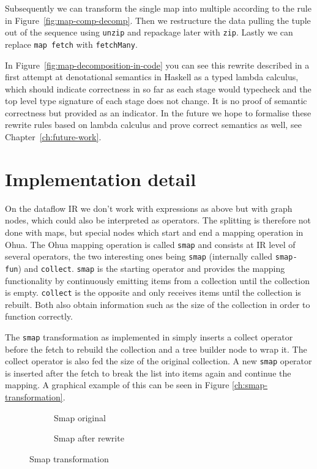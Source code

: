 Subsequently we can transform the single map into multiple according to the rule in Figure~\ref{fig:map-comp-decomp}.
Then we restructure the data pulling the tuple out of the sequence using \texttt{unzip} and repackage later with \texttt{zip}.
Lastly we can replace \texttt{map fetch} with \texttt{fetchMany}.

In Figure~\ref{fig:map-decomposition-in-code} you can see this rewrite described in a first attempt at denotational semantics in Haskell as a typed lambda calculus, which should indicate correctness in so far as each stage would typecheck and the top level type signature of each stage does not change.
It is no proof of semantic correctness but provided as an indicator.
In the future we hope to formalise these rewrite rules based on lambda calculus and prove correct semantics as well, see Chapter~\ref{ch:future-work}.


\section{Implementation detail}

On the dataflow IR we don't work with expressions as above but with graph nodes, which could also be interpreted as operators.
The splitting is therefore not done with maps, but special nodes which start and end a mapping operation in Ohua.
The Ohua mapping operation is called \texttt{smap} and consists at IR level of several operators, the two interesting ones being \texttt{smap} (internally called \texttt{smap-fun}) and \texttt{collect}.
\texttt{smap} is the starting operator and provides the mapping functionality by continuously emitting items from a collection until the collection is empty.
\texttt{collect} is the opposite and only receives items until the collection is rebuilt.
Both also obtain information such as the size of the collection in order to function correctly.

The \texttt{smap} transformation as implemented in \yauhau{} simply inserts a collect operator before the fetch to rebuild the collection and a tree builder node to wrap it.
The collect operator is also fed the size of the original collection.
A new \texttt{smap} operator is inserted after the fetch to break the list into items again and continue the mapping.
A graphical example of this can be seen in Figure \ref{ch:smap-transformation}.

\begin{figure}[h]
    \begin{subfigure}{\textwidth}
        \caption{Smap original}
    \end{subfigure}
    \begin{subfigure}{\textwidth}
        \caption{Smap after rewrite}
    \end{subfigure}
	\label{fig:smap-transformation}
	\caption{Smap transformation}
\end{figure}

